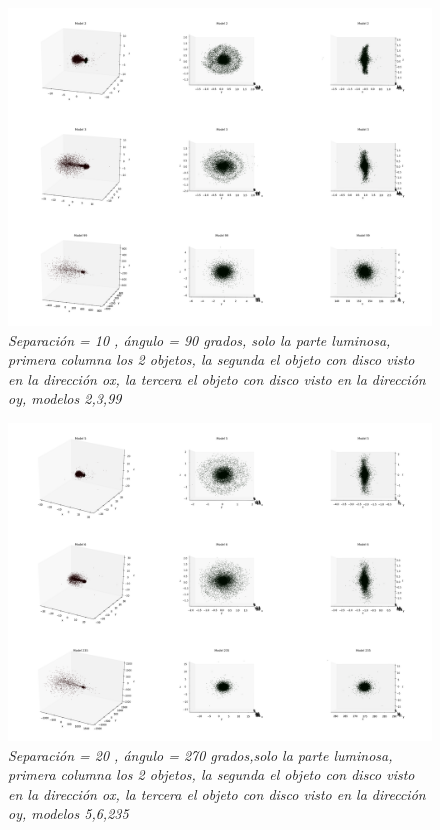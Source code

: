 \documentclass[12pt]{article} %
\renewcommand{\=}[1]{\stackrel{#1}{=}} %
\theoremstyle{definition}
\theoremstyle{remark}
\begin{document}
\begin{figure}[!ht]
 \centering
 \includegraphics[scale=0.2]{sep10.png}
 \caption{\emph{ Separación = 10 , ángulo = 90 grados, solo la parte luminosa, primera columna los 2 objetos, la segunda el objeto con disco visto en la dirección ox, la tercera el objeto con disco visto en la dirección oy, modelos 2,3,99 }}
\end{figure}


\begin{figure}[!ht]
 \centering
 \includegraphics[scale=0.2]{sep20.png}
 \caption{\emph{ Separación = 20 , ángulo = 270 grados,solo la parte luminosa, primera columna los 2 objetos, la segunda el objeto con disco visto en la dirección ox, la tercera el objeto con disco visto en la dirección oy, modelos 5,6,235 }}
\end{figure}
\end{document}
